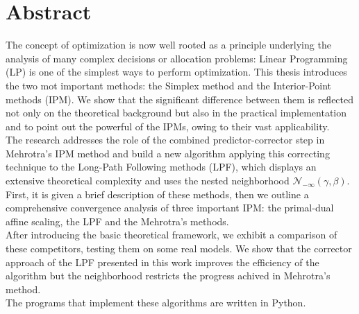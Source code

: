 \documentclass[a4paper,10 pt,titlepage,twoside]{book}
\theoremstyle{plain}
\theoremstyle{definition}
\theoremstyle{remark}
\begin{document}
\chapter*{Abstract}
The concept of optimization is now well rooted as a principle underlying the analysis
of many complex decisions or allocation problems: Linear Programming (LP) is one of the simplest ways to perform optimization.
This thesis introduces the two mot important methods: the Simplex method and the Interior-Point methods (IPM).
We show that the significant difference between them is reflected not only on the theoretical background but also in the practical implementation and to point out the powerful of the IPMs, owing to their vast applicability.\\
The research addresses the role of the combined predictor-corrector step in Mehrotra's IPM method and build  a new algorithm applying this correcting technique to the Long-Path Following methods (LPF), which displays an extensive theoretical complexity and uses the nested neighborhood $\mathcal{N}_{-\infty}(\gamma,\beta)$.\\
First, it is given a brief description of these methods,
then we outline a comprehensive convergence analysis of three important IPM: the primal-dual affine scaling, the LPF and the Mehrotra's methods. \\
After introducing the basic theoretical framework, we exhibit a comparison of these competitors, testing them on some real models. We show that the corrector approach of the LPF presented in this work improves the efficiency of the algorithm but the 
neighborhood restricts the progress achived in Mehrotra's method.\\
The programs that implement these algorithms are written in Python. 
\end{document}
